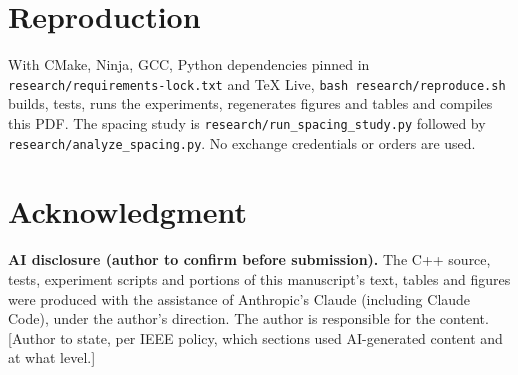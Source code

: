 \documentclass[conference]{IEEEtran}
\begin{document}
\section{Reproduction}
With CMake, Ninja, GCC, Python dependencies pinned in \texttt{research/requirements-lock.txt} and TeX Live, \texttt{bash research/reproduce.sh} builds, tests, runs the experiments, regenerates figures and tables and compiles this PDF. The spacing study is \texttt{research/run\_spacing\_study.py} followed by \texttt{research/analyze\_spacing.py}. No exchange credentials or orders are used.

\section*{Acknowledgment}
\textbf{AI disclosure (author to confirm before submission).} The C++ source, tests, experiment scripts and portions of this manuscript's text, tables and figures were produced with the assistance of Anthropic's Claude (including Claude Code), under the author's direction. The author is responsible for the content. [Author to state, per IEEE policy, which sections used AI-generated content and at what level.]


\end{document}
